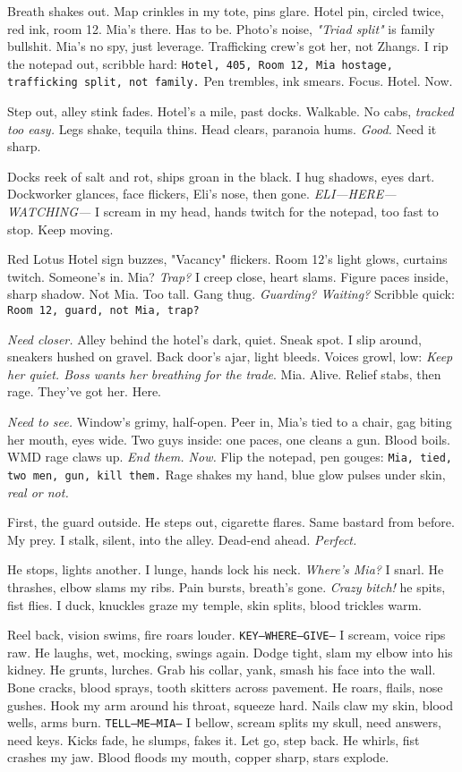 \documentclass[12pt,oneside]{book} %
\newcommand{\note}[1]{\texttt{#1}}
\begin{document}
Breath shakes out. Map crinkles in my tote, pins glare. Hotel pin, circled twice, red ink, room 12. Mia’s there. Has to be. Photo’s noise, \textit{"Triad split"} is family bullshit. Mia’s no spy, just leverage. Trafficking crew’s got her, not Zhangs. I rip the notepad out, scribble hard: \note{Hotel, 405, Room 12, Mia hostage, trafficking split, not family.} Pen trembles, ink smears. Focus. Hotel. Now.

Step out, alley stink fades. Hotel’s a mile, past docks. Walkable. No cabs, \textit{tracked too easy.} Legs shake, tequila thins. Head clears, paranoia hums. \textit{Good.} Need it sharp.

Docks reek of salt and rot, ships groan in the black. I hug shadows, eyes dart. Dockworker glances, face flickers, \textnormal{Eli}’s nose, then gone. \textit{ELI—HERE—WATCHING—} I scream in my head, hands twitch for the notepad, too fast to stop. Keep moving.

Red Lotus Hotel sign buzzes, "Vacancy" flickers. Room 12’s light glows, curtains twitch. Someone’s in. Mia? \textit{Trap?} I creep close, heart slams. Figure paces inside, sharp shadow. Not Mia. Too tall. Gang thug. \textit{Guarding? Waiting?} Scribble quick: \note{Room 12, guard, not Mia, trap?}

\textit{Need closer.} Alley behind the hotel’s dark, quiet. Sneak spot. I slip around, sneakers hushed on gravel. Back door’s ajar, light bleeds. Voices growl, low: \textit{Keep her quiet. Boss wants her breathing for the trade}. Mia. Alive. Relief stabs, then rage. They’ve got her. Here.

\textit{Need to see.} Window’s grimy, half-open. Peer in, Mia’s tied to a chair, gag biting her mouth, eyes wide. Two guys inside: one paces, one cleans a gun. Blood boils. WMD rage claws up. \textit{End them. Now.} Flip the notepad, pen gouges: \note{Mia, tied, two men, gun, kill them.} Rage shakes my hand, blue glow pulses under skin, \textit{real or not.}

First, the guard outside. He steps out, cigarette flares. Same bastard from before. My prey. I stalk, silent, into the alley. Dead-end ahead. \textit{Perfect.}

He stops, lights another. I lunge, hands lock his neck. \textit{Where’s Mia?} I snarl. He thrashes, elbow slams my ribs. Pain bursts, breath’s gone. \textit{Crazy bitch!} he spits, fist flies. I duck, knuckles graze my temple, skin splits, blood trickles warm.

Reel back, vision swims, fire roars louder. \note{KEY—WHERE—GIVE—} I scream, voice rips raw. He laughs, wet, mocking, swings again. Dodge tight, slam my elbow into his kidney. He grunts, lurches. Grab his collar, yank, smash his face into the wall. Bone cracks, blood sprays, tooth skitters across pavement. He roars, flails, nose gushes. Hook my arm around his throat, squeeze hard. Nails claw my skin, blood wells, arms burn. \note{TELL—ME—MIA—} I bellow, scream splits my skull, need answers, need keys. Kicks fade, he slumps, fakes it. Let go, step back. He whirls, fist crashes my jaw. Blood floods my mouth, copper sharp, stars explode.
\end{document}
